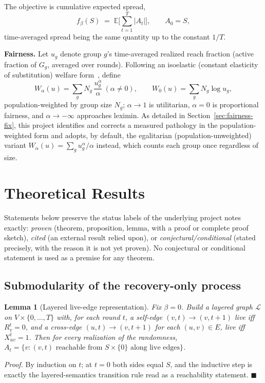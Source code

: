 \documentclass[journal]{IEEEtran}
\newtheorem{lemma}{Lemma}
\begin{document}
The objective is cumulative expected spread,
\begin{equation}
f_\beta(S) \;=\; \mathbb{E}\Big[\sum_{t=1}^T |A_t|\Big], \qquad A_0=S,
\end{equation}
time-averaged spread being the same quantity up to the constant $1/T$.

\textbf{Fairness.} Let $u_g$ denote group $g$'s time-averaged realized reach
fraction (active fraction of $G_g$, averaged over rounds). Following an
isoelastic (constant elasticity of substitution) welfare
form~\cite{rahmattalabi2021fair}, define
\begin{equation}
W_\alpha(u) = \sum_g N_g\,\frac{u_g^\alpha}{\alpha}\ (\alpha\ne0), \qquad
W_0(u) = \sum_g N_g \log u_g,
\end{equation}
population-weighted by group size $N_g$; $\alpha\to1$ is utilitarian,
$\alpha=0$ is proportional fairness, and $\alpha\to-\infty$ approaches
leximin. As detailed in Section~\ref{sec:fairness-fix}, this project
identifies and corrects a measured pathology in the population-weighted
form and adopts, by default, the egalitarian (population-unweighted)
variant $W_\alpha(u)=\sum_g u_g^\alpha/\alpha$ instead, which counts each
group once regardless of size.

\section{Theoretical Results}
\label{sec:theory}

Statements below preserve the status labels of the underlying project
notes exactly: \emph{proven} (theorem, proposition, lemma, with a proof or
complete proof sketch), \emph{cited} (an external result relied upon), or
\emph{conjectural/conditional} (stated precisely, with the reason it is
not yet proven). No conjectural or conditional statement is used as a
premise for any theorem.

\subsection{Submodularity of the recovery-only process}

\begin{lemma}[Layered live-edge representation]
\label{lem:layered}
Fix $\beta=0$. Build a layered graph $\mathcal{L}$ on $V\times\{0,\dots,T\}$
with, for each round $t$, a self-edge $(v,t)\to(v,t{+}1)$ live iff
$R^t_v=0$, and a cross-edge $(u,t)\to(v,t{+}1)$ for each $(u,v)\in E$, live
iff $X^t_{uv}=1$. Then for every realization of the randomness,
$A_t = \{v : (v,t) \text{ reachable from } S\times\{0\}\text{ along live edges}\}$.
\end{lemma}
\emph{Proof.} By induction on $t$; at $t=0$ both sides equal $S$, and the
inductive step is exactly the layered-semantics transition rule read as a
reachability statement. $\blacksquare$
\end{document}
